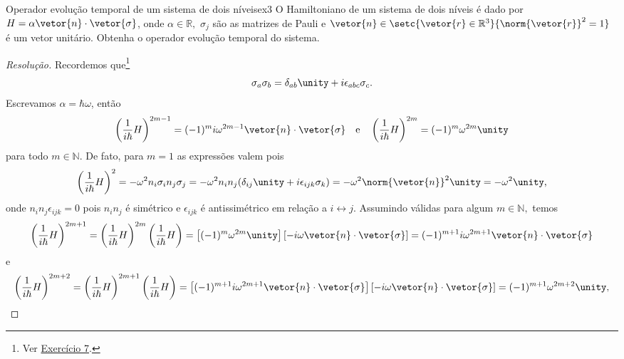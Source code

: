 \begin{exercício}{Operador evolução temporal de um sistema de dois níveis}{ex3}
   O Hamiltoniano de um sistema de dois níveis é dado por \(H = \alpha \vetor{n} \cdot \vetor{\sigma}\), onde \(\alpha \in \mathbb{R},\) \(\sigma_j\) são as matrizes de Pauli e \(\vetor{n} \in \setc{\vetor{r} \in \mathbb{R}^3}{\norm{\vetor{r}}^2 = 1}\) é um vetor unitário. Obtenha o operador evolução temporal do sistema.
\end{exercício}
\begin{proof}[Resolução]
   Recordemos que\footnote{Ver \href{https://github.com/louisradial/4300429-grupos-e-tensores/releases/tag/lista1}{Exercício 7}.}
   \begin{equation*}
      \sigma_a \sigma_b = \delta_{ab} \unity + i \epsilon_{abc} \sigma_c.
   \end{equation*}
   Escrevamos \(\alpha = \hbar \omega\), então
   \begin{equation*}
      \left(\frac{1}{i \hbar} H\right)^{2m-1} = (-1)^{m} i\omega^{2m-1} \vetor{n} \cdot \vetor{\sigma}
      \quad\text{e}\quad
      \left(\frac{1}{i \hbar} H\right)^{2m} = (-1)^m \omega^{2m} \unity
   \end{equation*}
   para todo \(m \in \mathbb{N}\). De fato, para \(m = 1\) as expressões valem pois
   \begin{equation*}
      \left(\frac{1}{i\hbar} H\right)^2 = - \omega^2 n_i \sigma_i n_j \sigma_j = - \omega^2 n_i n_j (\delta_{ij} \unity + i \epsilon_{ijk} \sigma_k) = -\omega^2 \norm{\vetor{n}}^2 \unity = -\omega^2 \unity,
   \end{equation*}
   onde \(n_i n_j \epsilon_{ijk} = 0\) pois \(n_i n_j\) é simétrico e \(\epsilon_{ijk}\) é antissimétrico em relação a \(i \leftrightarrow j.\) Assumindo válidas para algum \(m \in \mathbb{N},\) temos
   \begin{equation*}
      \left(\frac{1}{i \hbar} H\right)^{2m+1} =\left(\frac{1}{i \hbar} H\right)^{2m}\left(\frac{1}{i \hbar} H\right) = \left[(-1)^m \omega^{2m} \unity\right] \left[-i \omega \vetor{n} \cdot \vetor{\sigma}\right] = (-1)^{m+1} i\omega^{2m + 1} \vetor{n} \cdot \vetor{\sigma}
   \end{equation*}
   e
   \begin{equation*}
      \left(\frac{1}{i \hbar} H\right)^{2m+2} =\left(\frac{1}{i \hbar} H\right)^{2m+1}\left(\frac{1}{i \hbar} H\right) = \left[(-1)^{m+1} i\omega^{2m + 1} \vetor{n} \cdot \vetor{\sigma}\right] \left[-i \omega \vetor{n} \cdot \vetor{\sigma}\right] = (-1)^{m+1} \omega^{2m + 2} \unity,

\end{equation*}
\end{proof}
